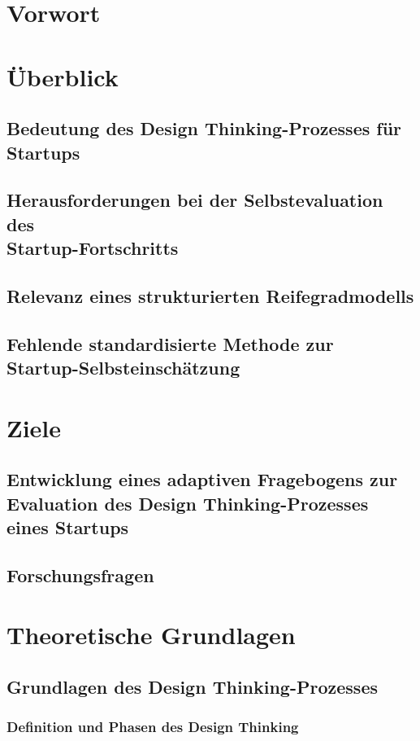 \thispagestyle{fancy}
\chapter{Vorwort}
\chapter{Überblick}

\section{Bedeutung des Design Thinking-Prozesses für Startups}
\section{Herausforderungen bei der Selbstevaluation des \\ Startup-Fortschritts}
\section{Relevanz eines strukturierten Reifegradmodells}
\section{Fehlende standardisierte Methode zur \\ Startup-Selbsteinschätzung}
\chapter{Ziele}

\section{Entwicklung eines adaptiven Fragebogens zur Evaluation des Design Thinking-Prozesses eines Startups}
\section{Forschungsfragen}


\chapter{Theoretische Grundlagen}

\section{Grundlagen des Design Thinking-Prozesses}
\subsection{Definition und Phasen des Design Thinking}
